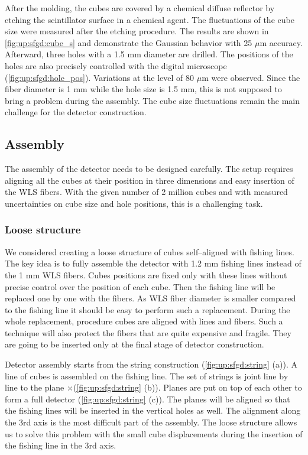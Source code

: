 \documentclass[main.tex]{subfiles}
\begin{document}
After the molding, the cubes are covered by a chemical diffuse reflector by etching the scintillator surface in a chemical agent. The fluctuations of the cube size were measured after the etching procedure. The results are shown in \autoref{fig:up:sfgd:cube_s} and demonstrate the Gaussian behavior with 25 $\mu$m accuracy. Afterward, three holes with a 1.5 mm diameter are drilled. The positions of the holes are also precisely controlled with the digital microscope (\autoref{fig:up:sfgd:hole_pos}). Variations at the level of 80 $\mu$m were observed. Since the fiber diameter is 1 mm while the hole size is 1.5 mm, this is not supposed to bring a problem during the assembly. The cube size fluctuations remain the main challenge for the detector construction.

\subsection{Assembly}
\label{sec:up:sfgd:ass}
The assembly of the detector needs to be designed carefully. The setup requires aligning all the cubes at their position in three dimensions and easy insertion of the WLS fibers. With the given number of 2 million cubes and with measured uncertainties on cube size and hole positions, this is a challenging task.

\subsubsection{Loose structure}
We considered creating a loose structure of cubes self--aligned with fishing lines. The key idea is to fully assemble the detector with 1.2 mm fishing lines instead of the 1 mm WLS fibers. Cubes positions are fixed only with these lines without precise control over the position of each cube. Then the fishing line will be replaced one by one with the fibers. As WLS fiber diameter is smaller compared to the fishing line it should be easy to perform such a replacement. During the whole replacement, procedure cubes are aligned with lines and fibers. Such a technique will also protect the fibers that are quite expensive and fragile. They are going to be inserted only at the final stage of detector construction.

Detector assembly starts from the string construction (\autoref{fig:up:sfgd:string} (a)). A line of \sfgdx cubes is assembled on the fishing line. The set of \sfgdy strings is joint line by line to the plane \sfgdx$\times$\sfgdy (\autoref{fig:up:sfgd:string} (b)). Planes are put on top of each other to form a full detector (\autoref{fig:up:sfgd:string} (c)). The planes will be aligned so that the fishing lines will be inserted in the vertical holes as well. The alignment along the 3rd axis is the most difficult part of the assembly. The loose structure allows us to solve this problem with the small cube displacements during the insertion of the fishing line in the 3rd axis.
\end{document}
